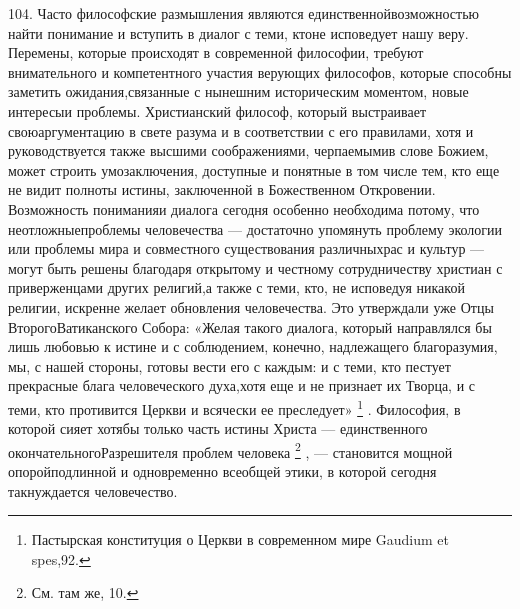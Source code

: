 \documentclass[a5paper,10pt]{article}
\begin{document}
104. Часто философские размышления являются единственнойвозможностью найти
понимание и вступить в диалог с теми, ктоне исповедует нашу веру. Перемены,
которые происходят в современной философии, требуют внимательного и
компетентного участия верующих философов, которые способны заметить
ожидания,связанные с нынешним историческим моментом, новые интересыи проблемы.
Христианский философ, который выстраивает своюаргументацию в свете разума и в
соответствии с его правилами, хотя и руководствуется также высшими
соображениями, черпаемымив слове Божием, может строить умозаключения, доступные
и понятные в том числе тем, кто еще не видит полноты истины, заключенной в
Божественном Откровении. Возможность пониманияи диалога сегодня особенно
необходима потому, что неотложныепроблемы человечества — достаточно упомянуть
проблему экологии или проблемы мира и совместного существования различныхрас и
культур — могут быть решены благодаря открытому и честному сотрудничеству
христиан с приверженцами других религий,а также с теми, кто, не исповедуя
никакой религии, искренне желает обновления человечества. Это утверждали уже
Отцы ВторогоВатиканского Собора: «Желая такого диалога, который направлялся бы
лишь любовью к истине и с соблюдением, конечно, надлежащего благоразумия, мы, с
нашей стороны, готовы вести его с каждым: и с теми, кто пестует прекрасные
блага человеческого духа,хотя еще и не признает их Творца, и с теми, кто
противится Церкви и всячески ее преследует» \footnote{Пастырская конституция о
Церкви в современном мире Gaudium et spes,92.} . Философия, в которой сияет
хотябы только часть истины Христа — единственного окончательногоРазрешителя
проблем человека \footnote{См. там же, 10.} , — становится мощной
опоройподлинной и одновременно всеобщей этики, в которой сегодня такнуждается
человечество.
\end{document}
